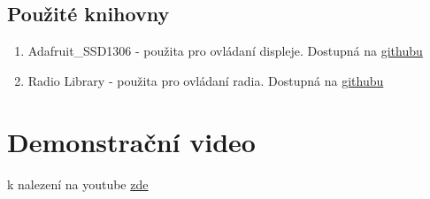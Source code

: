 \documentclass{article}
\begin{document}
	\subsection{Použité knihovny}
	\begin{enumerate}
		\item Adafruit\_SSD1306 - použita pro ovládaní displeje. Dostupná na \href{https://github.com/adafruit/Adafruit_SSD1306}{githubu}
		\item Radio Library - použita pro ovládaní radia. Dostupná na \href{https://github.com/mathertel/Radio/tree/master}{githubu}
	\end{enumerate}
	
	\section{ Demonstrační video }
	k nalezení na youtube \href{https://youtu.be/VmVauFg2x14}{zde}
	
	
	
\end{document}

